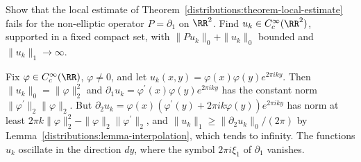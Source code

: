 \begin{exercise}\label{distributions:exercise-estimate-not-elliptic}
Show that the local estimate of Theorem~\ref{distributions:theorem-local-estimate} fails for the non-elliptic operator $P = \partial_1$ on $\RR^2$. Find $u_k \in C_c^\infty(\RR^2)$, supported in a fixed compact set, with
$\|Pu_k\|_0 + \|u_k\|_0$ bounded and $\|u_k\|_1 \to \infty$.
\end{exercise}

\begin{solution}
Fix $\varphi \in C_c^\infty(\RR)$, $\varphi \neq 0$, and let $u_k(x, y) = \varphi(x)\varphi(y)e^{2\pi iky}$. Then $\|u_k\|_0 = \|\varphi\|_2^2$ and $\partial_1u_k = \varphi^{\prime}(x)\varphi(y)e^{2\pi iky}$ has the constant norm
$\|\varphi^{\prime}\|_2\|\varphi\|_2$. But $\partial_2u_k = \varphi(x)(\varphi^{\prime}(y) + 2\pi ik\varphi(y))e^{2\pi iky}$ has norm at least $2\pi k\|\varphi\|_2^2 - \|\varphi\|_2\|\varphi^{\prime}\|_2$, and
$\|u_k\|_1 \geq \|\partial_2u_k\|_0/(2\pi)$ by Lemma~\ref{distributions:lemma-interpolation}, which tends to infinity. The functions $u_k$ oscillate in the direction $dy$, where the symbol $2\pi i\xi_1$ of $\partial_1$ vanishes.
\end{solution}
